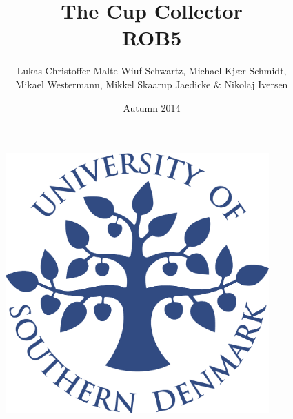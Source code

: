 \title{The Cup Collector \\ROB5}
\author{Lukas Christoffer Malte Wiuf Schwartz, Michael Kjær Schmidt, \\Mikael Westermann, Mikkel Skaarup Jaedicke \& Nikolaj Iversen}
\date{Autumn 2014}
\begin{figure}
\centering
\includegraphics[width=0.9\textwidth]{graphics/forside.png}
\end{figure}
\maketitle